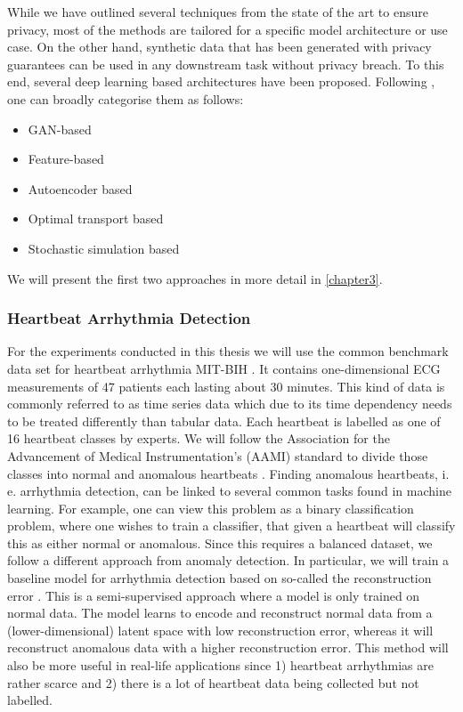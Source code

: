 While we have outlined several techniques from the state of the art to ensure privacy, most of the methods are tailored for a specific model architecture or use case. On the other hand, synthetic data that has been generated with privacy guarantees can be used in any downstream task without privacy breach. To this end, several deep learning based architectures have been proposed. Following \parencite{hu2023sok}, one can broadly categorise them as follows:
\begin{itemize}
    \item GAN-based
    \item Feature-based
    \item Autoencoder based {\tiny \Parencite[see e. g.][for a generator based on a variational autoencoder that is trained with DP-SGD]{vae}}
    \item Optimal transport based {\tiny \Parencite[see e. g.][for generator based on the so-called Sinkhorn divergence]{cao2021dont}}
    \item Stochastic simulation based {\tiny \Parencite[see e. g.][for a differentially-private diffusion model]{dpgen}}
\end{itemize}

We will present the first two approaches in more detail in \cref{chapter3}.

\subsubsection*{Heartbeat Arrhythmia Detection}
For the experiments conducted in this thesis we will use the common benchmark data set for heartbeat arrhythmia MIT-BIH \parencite{moody2001impact}. It contains one-dimensional ECG measurements of 47 patients each lasting about 30 minutes. This kind of data is commonly referred to as time series data which due to its time dependency needs to be treated differently than tabular data. Each heartbeat is labelled as one of 16 heartbeat classes by experts. We will follow the Association for the Advancement of Medical Instrumentation's (AAMI) standard to divide those classes into normal and anomalous heartbeats \Parencite{aami}. Finding anomalous heartbeats, i. e. arrhythmia detection, can be linked to several common tasks found in machine learning. For example, one can view this problem as a binary classification problem, where one wishes to train a classifier, that given a heartbeat will classify this as either normal or anomalous. Since this requires a balanced dataset, we follow a different approach from anomaly detection. In particular, we will train a baseline model for arrhythmia detection based on so-called the reconstruction error \parencite[see][for an in-depth survey on anomaly detection with times series]{schmidl2022anomaly}. This is a semi-supervised approach where a model is only trained on normal data. The model learns to encode and reconstruct normal data from a (lower-dimensional) latent space with low reconstruction error, whereas it will reconstruct anomalous data with a higher reconstruction error. This method will also be more useful in real-life applications since 1) heartbeat arrhythmias are rather scarce and 2) there is a lot of heartbeat data being collected but not labelled.

